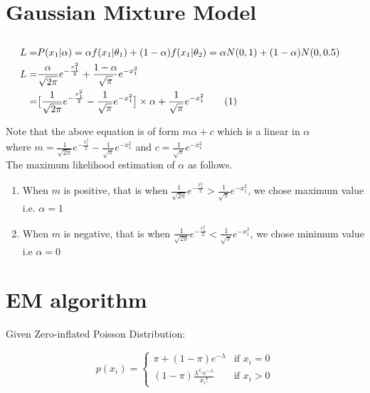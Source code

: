 \documentclass[a4paper,doc,notimes]{article}
\newcommand\numberthis{\addtocounter{equation}{1}\tag{\theequation}}
\begin{document}
\section{Gaussian Mixture Model}
\subsection{}

\begin{align*}
L = & P(x_1|\alpha) = \alpha f(x_1|\theta_1) + (1 - \alpha) f(x_1|\theta_2) = \alpha N(0, 1) + (1 - \alpha) N(0, 0.5)  & \\
L = & \frac{\alpha}{\sqrt{2 \pi}} e^{-\frac{x_1^2}{2}} + \frac{1 - \alpha}{\sqrt{\pi}} e^{-x_1^2} & \\
= & \big[\frac{1}{\sqrt{2 \pi}} e^{-\frac{x_1^2}{2}} - \frac{1}{\sqrt{\pi}} e^{-x_1^2} \big] \times \alpha + \frac{1}{\sqrt{\pi}} e^{-x_1^2} \numberthis \label{e:2a1} &  \\
\end{align*}

Note that the above equation is of form $m \alpha + c$ which is a linear in $\alpha$ \\ where $m = \frac{1}{\sqrt{2 \pi}} e^{-\frac{x_1^2}{2}} - \frac{1}{\sqrt{\pi}} e^{-x_1^2}$ and $c = \frac{1}{\sqrt{\pi}} e^{-x_1^2}$ \\
The maximum likelihood estimation of $\alpha$ as follows.
\begin{enumerate}
	\item When $m$ is positive, that is when $\frac{1}{\sqrt{2 \pi}} e^{-\frac{x_1^2}{2}} > \frac{1}{\sqrt{\pi}} e^{-x_1^2}$, we chose maximum value i.e. $\alpha=1$
	\item When $m$ is negative, that is when $\frac{1}{\sqrt{2 \pi}} e^{-\frac{x_1^2}{2}} < \frac{1}{\sqrt{\pi}} e^{-x_1^2}$, we chose minimum value i.e $\alpha=0$
\end{enumerate}

\section{EM algorithm}

Given Zero-inflated Poisson Distribution:

\begin{equation}\label{e:observed}
p(x_i) = \begin{cases}
\pi + (1-\pi) e^{-\lambda} & \text{if } x_i = 0\\
(1-\pi) \frac{\lambda^{x_i} e^{-\lambda}}{x_i!} &  \text{if } x_i > 0
\end{cases}
\end{equation}
\end{document}
